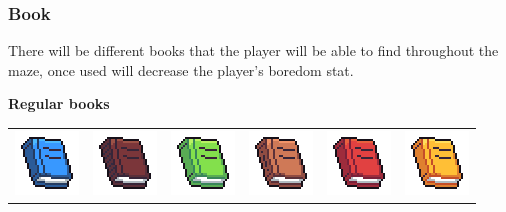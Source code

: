 \documentclass[../Main.tex]{subfiles}
\begin{document}
\begin{center}
\begin{tabular}{ m{} m{} m{} m{} m{} }
                \end{tabular}
            \end{center}
        \clearpage
        \subsubsection{Book}
            There will be different books that the player will be able to find throughout the maze, once used will decrease the player's boredom stat.

            \textbf{Regular books}
            \begin{center}
                \begin{tabular}{ m{} m{} m{} m{} m{} m{} }
                    \centerline{\includegraphics{../res/textures/items/potions/books/Blue.png}} & \centerline{\includegraphics{../res/textures/items/potions/books/DarkBrown.png}} & \centerline{\includegraphics{../res/textures/items/potions/books/Green.png}} & \centerline{\includegraphics{../res/textures/items/potions/books/LightBrown.png}} & \centerline{\includegraphics{../res/textures/items/potions/books/Red.png}} & \centerline{\includegraphics{../res/textures/items/potions/books/Yellow.png}}\\
                \end{tabular}
            \end{center}
\end{document}
